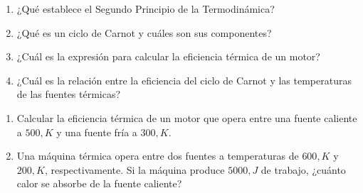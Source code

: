 \documentclass[../main]{subfiles}
\begin{document}

\begin{enumerate}
\item ¿Qué establece el Segundo Principio de la Termodinámica?
\item ¿Qué es un ciclo de Carnot y cuáles son sus componentes?
\item ¿Cuál es la expresión para calcular la eficiencia térmica de un motor?
\item ¿Cuál es la relación entre la eficiencia del ciclo de Carnot y las temperaturas de las fuentes térmicas?
\end{enumerate}

\begin{enumerate}
\item Calcular la eficiencia térmica de un motor que opera entre una fuente caliente a $500,K$ y una fuente fría a $300,K$.
\item Una máquina térmica opera entre dos fuentes a temperaturas de $600,K$ y $200,K$, respectivamente. Si la máquina produce $5000,J$ de trabajo, ¿cuánto calor se absorbe de la fuente caliente?
\end{enumerate}
\end{document}
